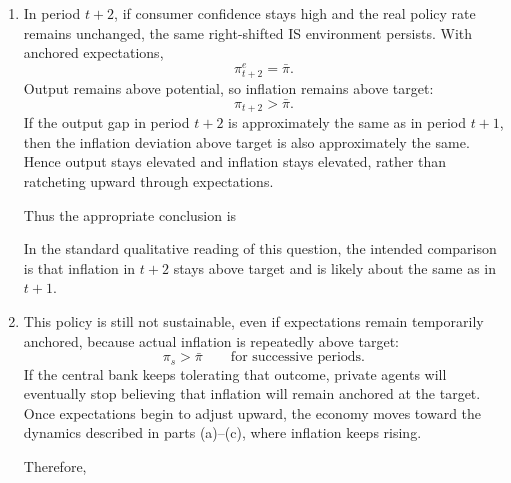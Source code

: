 \documentclass[12pt]{article}
\begin{document}
\begin{enumerate}[label=(\alph*)]
    \item
    In period \(t+2\), if consumer confidence stays high and the real policy rate remains unchanged, the same right-shifted IS environment persists. With anchored expectations,
    \[
    \pi_{t+2}^e=\bar{\pi}.
    \]
    Output remains above potential, so inflation remains above target:
    \[
    \pi_{t+2}>\bar{\pi}.
    \]
    If the output gap in period \(t+2\) is approximately the same as in period \(t+1\), then the inflation deviation above target is also approximately the same. Hence output stays elevated and inflation stays elevated, rather than ratcheting upward through expectations.

    Thus the appropriate conclusion is
    \begin{center}
    \end{center}
    In the standard qualitative reading of this question, the intended comparison is that inflation in \(t+2\) stays above target and is likely about the same as in \(t+1\).

    \item
    This policy is still not sustainable, even if expectations remain temporarily anchored, because actual inflation is repeatedly above target:
    \[
    \pi_s>\bar{\pi}
    \qquad \text{for successive periods.}
    \]
    If the central bank keeps tolerating that outcome, private agents will eventually stop believing that inflation will remain anchored at the target. Once expectations begin to adjust upward, the economy moves toward the dynamics described in parts (a)--(c), where inflation keeps rising.

    Therefore,
    \begin{center}
    \end{center}


\end{enumerate}
\end{document}
